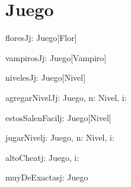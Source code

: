 \documentclass[spanish,a4paper]{article}
\begin{document}
\section{Juego}


\begin{problema}{floresJ}{j: Juego}{[Flor]}
\end{problema}

\begin{problema}{vampirosJ}{j: Juego}{[Vampiro]}
\end{problema}

\begin{problema}{nivelesJ}{j: Juego}{[Nivel]}
\end{problema}

\begin{problema}{agregarNivelJ}{j: Juego, n: Nivel, i: \ent}{}
	\asegura {(\forall k \leftarrow [0..i)) niveles(j)_k == niveles(pre(j))_k}
\end{problema}

\begin{problema}{estosSalenFacil}{j: Juego}{[Nivel]}
\end{problema}

\begin{problema}{jugarNivel}{j: Juego, n: Nivel, i: \ent}{}
\end{problema}

\begin{problema}{altoCheat}{j: Juego, i: \ent}{}
\end{problema}

\begin{problema}{muyDeExactas}{j: Juego}{\bool}
	
\end{problema}
\end{document}
